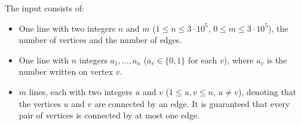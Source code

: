 
The input consists of:
\begin{itemize}
	\item One line with two integers $n$ and $m$ ($1 \leq n \leq 3 \cdot 10^5$, $0 \leq m \leq 3 \cdot 10^5$), the number of vertices and the number of edges.
	\item One line with $n$ integers $a_1,\dots, a_n$ ($a_v \in \{0, 1\}$ for each $v$), where $a_v$ is the number written on vertex $v$.
	\item $m$ lines, each with two integers $u$ and $v$ ($1 \leq u,v \leq n$,
	$u \neq v$), denoting that the vertices $u$ and $v$ are connected by an
	edge. It is guaranteed that every pair of vertices is connected by at most
	one edge.
\end{itemize}

